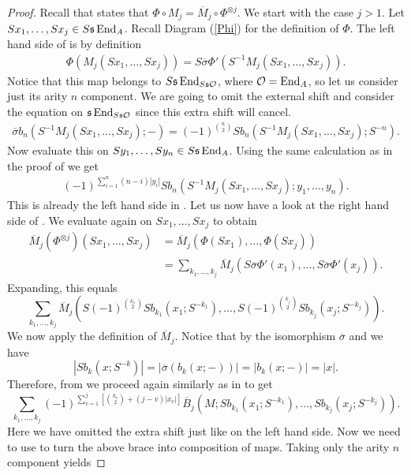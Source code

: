 \documentclass[Thesis.tex]{subfiles}
\begin{document}
\begin{proof}
Recall that  states that $\Phi\circ M_j = \overline{M}_j\circ \Phi^{\otimes j}$. We start with the case $j>1$. Let $Sx_1,\dots, Sx_j\in S\mathfrak{s}\operatorname{End}_A$. Recall Diagram (\ref{Phi}) for the definition of $\Phi$. The left hand side of  is by definition
\begin{align*}
\Phi(M_j(Sx_1,\dots, Sx_j)) = S\overline{\sigma}\Phi'(S^{-1}M_j(Sx_1,\dots, Sx_j)).
\end{align*}
Notice that this map belongs to $S\mathfrak{s}\operatorname{End}_{S\mathfrak{s}{\mathcal O}}$, where ${\mathcal O}=\operatorname{End}_A$, so let us consider just its arity $n$ component. We are going to omit the external shift and consider the equation on $\mathfrak{s}\operatorname{End}_{S\mathfrak{s}{\mathcal O}}$ since this extra shift will cancel.
\begin{align*}
\overline{\sigma}b_n(S^{-1}M_j(Sx_1,\dots, Sx_j);-)=(-1)^{\binom{n}{2}}Sb_n(S^{-1}M_j(Sx_1,\dots, Sx_j);S^{-n}).
\end{align*}
Now evaluate this on $Sy_1,\dots, Sy_n\in S\mathfrak{s}\operatorname{End}_A$. Using the same calculation as in the proof of  we get
\begin{align}
(-1)^{\sum_{i=1}^n(n-i)|y_i|}Sb_n(S^{-1}M_j(Sx_1,\dots, Sx_j);y_1,\dots, y_n).
\end{align}
This is already the left hand side in . Let us now have a look at the right hand side of . We evaluate again on $Sx_1,\dots, Sx_j$ to obtain
\begin{align*}
\overline{M}_j(\Phi^{\otimes j})(Sx_1,\dots, Sx_j) & = \overline{M}_j(\Phi(Sx_1),\dots, \Phi(Sx_j))\\
&=\sum_{k_1,\dots, k_j}\overline{M}_j(S\overline{\sigma}\Phi'(x_1),\dots, S\overline{\sigma}\Phi'(x_j)).
\end{align*}
Expanding, this equals
\begin{equation}\label{intermediate}
\sum_{k_1,\dots, k_j}\overline{M}_j(S(-1)^{\binom{k_1}{2}}Sb_{k_1}(x_1;S^{-k_1}),\dots,S(-1)^{\binom{k_j}{2}}Sb_{k_j}(x_j;S^{-k_j}) ).
\end{equation}
We now apply the definition of $\overline{M}_j$. Notice that by the isomorphism $\overline{\sigma}$ and  we have
\[
|Sb_k(x;S^{-k})|=|\overline{\sigma}(b_k(x;-))|=|b_k(x;-)|=|x|.
\]
Therefore, from  we proceed again similarly as in  to get
\[
\sum_{k_1,\dots, k_j}(-1)^{\sum_{v=1}^j\left[\binom{k_v}{2}+(j-v)|x_v|\right]}\overline{B}_j(M;Sb_{k_1}(x_1;S^{-k_1}),\dots,Sb_{k_j}(x_j;S^{-k_j})).
\]
Here we have omitted the extra shift just like on the left hand side. Now we need to use  to turn the above brace into composition of maps. Taking only the arity $n$ component yields

\end{proof}
\end{document}
